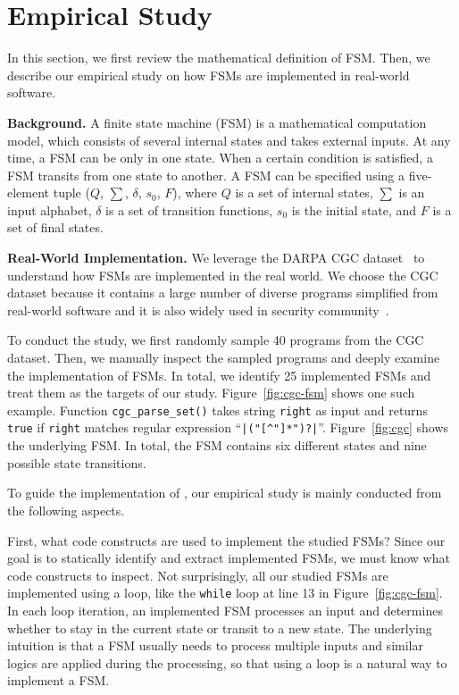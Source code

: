 \section{Empirical Study}
\label{sec:study}
In this section, we first review the mathematical definition of FSM. Then,
we describe our empirical study on how FSMs are implemented
in real-world software.

\noindent\textbf{Background.}
A finite state machine (FSM) is a mathematical computation model,
which consists of several internal states and takes external inputs.
At any time, a FSM can be only in one state.
When a certain condition is satisfied,
a FSM transits from one state to another.
A FSM can be specified using a five-element tuple ($Q$, $\sum$, $\delta$, $s_0$, $F$),
where $Q$ is a set of internal states, $\sum$ is an input alphabet,
$\delta$ is a set of transition functions,
$s_0$ is the initial state, and $F$ is a set of final states.

\noindent\textbf{Real-World Implementation.}
We leverage the DARPA CGC dataset~\cite{CGC} to
understand how FSMs are implemented in the real world.
We choose the CGC dataset because it
contains a large number of diverse programs simplified
from real-world software and it
is also widely used in security
community~\cite{QSYM, Driller, VUzzer}.


To conduct the study, we first randomly sample
40 programs from the CGC dataset. Then,
we manually inspect the sampled programs and deeply examine the implementation of FSMs.
In total, we identify 25 implemented FSMs
and treat them as the targets of our study.
Figure~\ref{fig:cgc-fsm} shows one such example.
Function \texttt{cgc\_parse\_set()} takes string \texttt{right}
as input and returns \texttt{true} if \texttt{right} matches
regular expression ``\verb/|("[^"]*")?|/''.
Figure~\ref{fig:cgc} shows the underlying FSM.
In total, the FSM contains six different states
and nine possible state transitions.





To guide the implementation of \Tool{}, our empirical study
is mainly conducted from the following aspects.

First, what code constructs are used to implement the studied FSMs?
Since our goal is to statically identify and extract implemented FSMs,
we must know what code constructs to inspect.
Not surprisingly, all our studied FSMs are implemented using a loop,
like the \texttt{while} loop at line 13 in Figure~\ref{fig:cgc-fsm}.
In each loop iteration, an implemented FSM processes an input and
determines whether to stay in the current state or transit to a new state.
The underlying intuition is that a FSM usually needs to process
multiple inputs and similar logics are applied during the processing,
so that using a loop is a natural way to implement a FSM.

